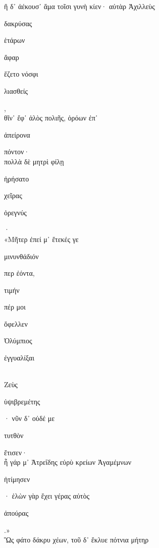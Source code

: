 \documentclass{ransom}
\begin{document}
\renewcommand{\rightheaderwhat}{\rightheaderwhatglosses}%
\begin{foreignpage}
\begin{graytext}
ἣ δ᾽ ἀέκουσ᾽ ἅμα τοῖσι γυνὴ κίεν· αὐτὰρ Ἀχιλλεὺς\\
\begin{whitetext}δακρύσας\end{whitetext} ἑτάρων \begin{whitetext}ἄφαρ\end{whitetext} ἕζετο νόσφι \begin{whitetext}λιασθείς\end{whitetext},\\
θῖν᾽ ἔφ᾽ ἁλὸς πολιῆς, ὁρόων ἐπ᾽ \begin{whitetext}ἀπείρονα\end{whitetext} πόντον·\hfill{}\\
πολλὰ δὲ μητρὶ φίλῃ \begin{whitetext}ἠρήσατο\end{whitetext} χεῖρας \begin{whitetext}ὀρεγνύς\end{whitetext}·\\
«Μῆτερ ἐπεί μ᾽ ἔτεκές γε \begin{whitetext}μινυνθάδιόν\end{whitetext} περ ἐόντα,\\
\begin{whitetext}τιμήν\end{whitetext} πέρ μοι \begin{whitetext}ὄφελλεν\end{whitetext} Ὀλύμπιος \begin{whitetext}ἐγγυαλίξαι\end{whitetext}\\
Ζεὺς \begin{whitetext}ὑψιβρεμέτης\end{whitetext}· νῦν δ᾽ οὐδέ με \begin{whitetext}τυτθὸν\end{whitetext} ἔτισεν·\\
ἦ γάρ μ᾽ Ἀτρεΐδης εὐρὺ κρείων Ἀγαμέμνων\hfill{}\\
\begin{whitetext}ἠτίμησεν\end{whitetext}· ἑλὼν γὰρ ἔχει γέρας αὐτὸς \begin{whitetext}ἀπούρας\end{whitetext}.»\\
Ὣς φάτο δάκρυ χέων, τοῦ δ᾽ ἔκλυε πότνια μήτηρ\\

\end{graytext}
\end{foreignpage}
\end{document}
